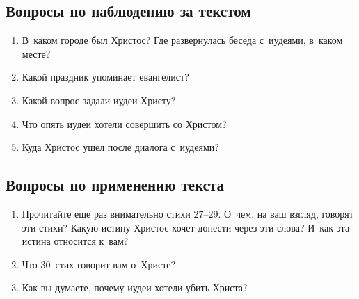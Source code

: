 \documentclass[a4paper,12pt]{article}
\begin{document}
\subsection*{Вопросы по наблюдению за текстом}
\begin{enumerate}
    \item В~каком городе был Христос? Где развернулась беседа с~иудеями, в~каком месте? 
    
    \myline
    
    \myline
    \item Какой праздник упоминает евангелист? 
    
    \myline
    
    \myline
    \item Какой вопрос задали иудеи Христу? 
    
    \myline
    
    \myline
    \item Что опять иудеи хотели совершить со Христом? 
    
    \myline
    
    \myline
    \item Куда Христос ушел после диалога с~иудеями? 
    
    \myline
    
    \myline
\end{enumerate}

\subsection*{Вопросы по применению текста} 
\begin{enumerate}
    \item Прочитайте еще раз внимательно стихи 27--29. О~чем, на ваш взгляд, говорят эти стихи? Какую истину Христос хочет донести через эти слова? И~как эта истина относится к~вам?
    
    \myline
    
    \myline

    \myline    
    \item Что 30~стих говорит вам о~Христе? 
    
    \myline
    
    \myline
    \item Как вы думаете, почему иудеи хотели убить Христа?
    
    \myline
    
    \myline
\end{enumerate}


\end{document}
